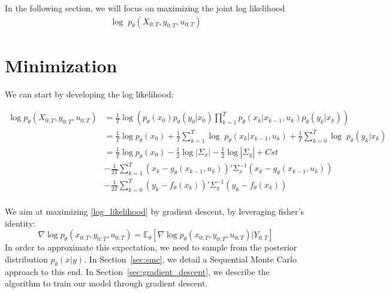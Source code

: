 \documentclass[10pt,a4paper]{article}
\begin{document}
In the following section, we will focus on maximizing the joint log likelihood
\begin{align}
        \log \; p_{\theta}(X_{0:T}, y_{0:T}, u_{0:T})
        \label{log_likelihood}
\end{align}

\section{Minimization}
We can start by developing the log likelihood:

\begin{align*}
        \log p_{\theta}(X_{0:T}, y_{0:T}, u_{0:T}) & = \frac{1}{T} \log\left(p_\theta(x_0)p_\theta(y_0 | x_0)\prod_{k=1}^{T} p_{\theta}(x_k | x_{k-1}, u_k) p_{\theta}(y_k | x_k)\right)                             \\
                                                   & = \frac{1}{T} \log p_\theta(x_0) + \frac{1}{T} \sum_{k=1}^{T} \log \; p_{\theta}(x_k | x_{k-1}, u_k) + \frac{1}{T} \sum_{k=0}^{T} \log \; p_{\theta}(y_k | x_k) \\
                                                   & = \frac{1}{T} \log p_\theta(x_0) -\frac{1}{2} \log|\Sigma_x| -\frac{1}{2} \log|\Sigma_y| + Cst                                                                  \\
                                                   & - \frac{1}{2T} \sum_{k=1}^{T}(x_k - g_\theta(x_{k-1}, u_{k}))' \Sigma_x^{-1} (x_k - g_\theta(x_{k-1}, u_{k}))                                                   \\
                                                   & - \frac{1}{2T} \sum_{k=0}^{T}(y_k - f_\theta(x_k))' \Sigma_y^{-1} (y_k - f_\theta(x_k))                                                                         \\
\end{align*}

We aim at maximizing \ref{log_likelihood} by gradient descent, by leveraging fisher's identity:
$$
        \nabla \log p_\theta(x_{0:T}, y_{0:T}, u_{0:T}) = \mathbb{E}_\theta \left[ \nabla\log p_\theta(x_{0:T}, y_{0:T}, u_{0:T}) | Y_{0:T} \right]
$$
In order to approximate this expectation, we need to sample from the posterior distribution $p_\theta(x|y)$.
In Section~\ref{sec:smc}, we detail a Sequential Monte Carlo approach to this end.
In Section~\ref{sec:gradient_descent}, we describe the algorithm to train our model through gradient descent.
\end{document}
